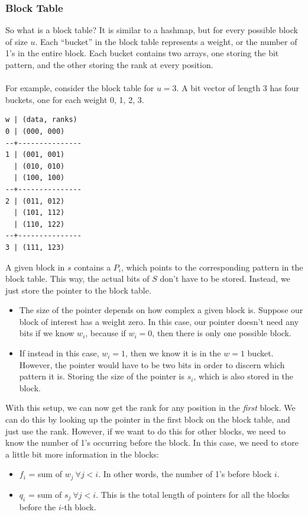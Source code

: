 \documentclass[10pt]{article}
\begin{document}
\subsubsection*{Block Table}
So what is a block table?  It is similar to a hashmap, but for every possible block of size $u$.  Each ``bucket'' in the block table represents a weight, or the number of 1's in the entire block.  Each bucket contains two arrays, one storing the bit pattern, and the other storing the rank at every position.\\\\
For example, consider the block table for $u = 3$.  A bit vector of length 3 has four buckets, one for each weight 0, 1, 2, 3.
\begin{verbatim}
w | (data, ranks)
0 | (000, 000)
--+---------------
1 | (001, 001)
  | (010, 010)
  | (100, 100)
--+---------------
2 | (011, 012)
  | (101, 112)
  | (110, 122)
--+---------------
3 | (111, 123)
\end{verbatim}
A given block in $s$ contains a $P_i$, which points to the corresponding pattern in the block table.  This way, the actual bits of $S$ don't have to be stored.  Instead, we just store the pointer to the block table.
\begin{itemize}
    \item The size of the pointer depends on how complex a given block is.  Suppose our block of interest has a weight zero.  In this case, our pointer doesn't need any bits if we know $w_i$, because if $w_i = 0$, then there is only one possible block.
    \item If instead in this case, $w_i = 1$, then we know it is in the $w = 1$ bucket.  However, the pointer would have to be two bits in order to discern which pattern it is.  Storing the size of the pointer is $s_i$, which is also stored in the block.
\end{itemize}
With this setup, we can now get the rank for any position in the \textit{first} block.  We can do this by looking up the pointer in the first block on the block table, and just use the rank.  However, if we want to do this for other blocks, we need to know the number of 1's occurring before the block.  In this case, we need to store a little bit more information in the blocks:
\begin{itemize}
    \item $f_i$ = sum of $w_j \:\forall j < i$.  In other words, the number of 1's before block $i$.
    \item $q_i$ = sum of $s_j \:\forall j < i$.  This is the total length of pointers for all the blocks before the $i$-th block.
\end{itemize}
\end{document}

